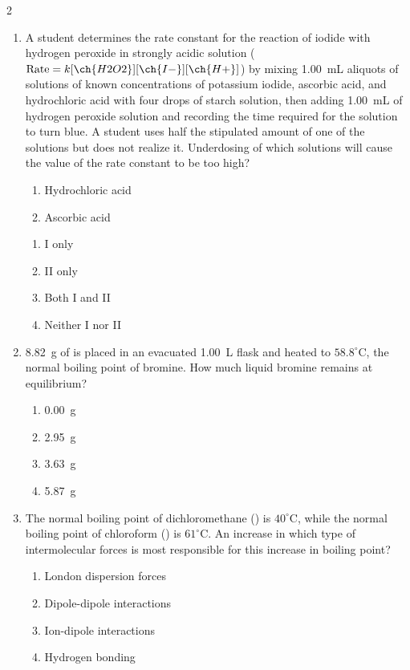 \documentclass[titlepage,10pt,letterpaper]{article}
\begin{document}
\begin{multicols}{2}
\begin{enumerate}[leftmargin=*]
\item A student determines the rate constant for the reaction of iodide with hydrogen peroxide in strongly acidic solution ($\text{Rate} = k[\ch{H2O2}][\ch{I-}][\ch{H+}]$) by mixing 1.00~mL aliquots of solutions of known concentrations of potassium iodide, ascorbic acid, and hydrochloric acid with four drops of starch solution, then adding 1.00~mL of hydrogen peroxide solution and recording the time required for the solution to turn blue. A student uses half the stipulated amount of one of the solutions but does not realize it. Underdosing of which solutions will cause the value of the rate constant to be too high?
\begin{enumerate}[label=\Roman*.]
    \item Hydrochloric acid
    \item Ascorbic acid
\end{enumerate}
\begin{enumerate}[label=(\alph*)]
    \item I only
    \item II only
    \item Both I and II
    \item Neither I nor II
\end{enumerate}

\item 8.82~g of  is placed in an evacuated 1.00~L flask and heated to $58.8^\circ\text{C}$, the normal boiling point of bromine. How much liquid bromine remains at equilibrium?
\begin{enumerate}[label=(\alph*)]
    \item 0.00~g
    \item 2.95~g
    \item 3.63~g
    \item 5.87~g
\end{enumerate}

\item The normal boiling point of dichloromethane () is $40^\circ\text{C}$, while the normal boiling point of chloroform () is $61^\circ\text{C}$. An increase in which type of intermolecular forces is most responsible for this increase in boiling point?
\begin{enumerate}[label=(\alph*)]
    \item London dispersion forces
    \item Dipole-dipole interactions
    \item Ion-dipole interactions
    \item Hydrogen bonding
\end{enumerate}


\end{enumerate}
\end{multicols}
\end{document}
